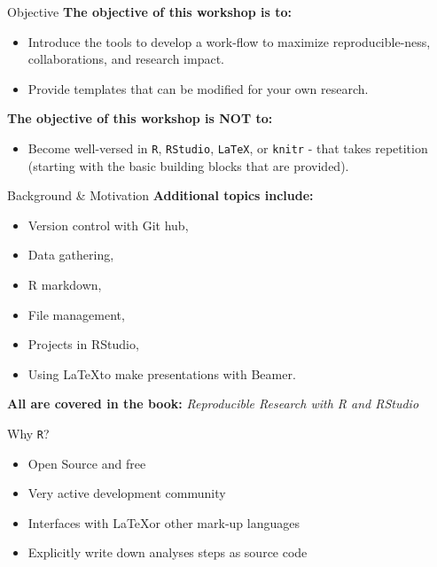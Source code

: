 \documentclass{beamer}\usepackage[]{graphicx}\usepackage[]{color}
\begin{document}
 \begin{frame}[t]{Objective}
   \textbf{The objective of this workshop is to:}
   \begin{itemize}
      \item   Introduce the tools to develop a work-flow to maximize reproducible-ness, collaborations, and research impact.
      \item Provide templates that can be modified for your own research.\vspace{1cm}
   \end{itemize}
   \textbf{The objective of this workshop is NOT to:}
   \begin{itemize}
      \item Become well-versed in \texttt{R}, \texttt{RStudio}, \texttt{\LaTeX}, or \texttt{knitr} - that takes repetition (starting with the basic building blocks that are provided).
   \end{itemize}
\end{frame}
 
\begin{frame}[t]{Background \& Motivation}
   \textbf{Additional topics include:}
   \begin{itemize}
\item  Version control with Git hub,
     \item Data gathering,
     \item R markdown,
     \item File management,
     \item Projects in RStudio,
     \item Using \LaTeX to make presentations with Beamer.\vspace{1cm} 
   \end{itemize}
   \textbf{All are covered in the book:} \emph{Reproducible Research with R and RStudio}
\end{frame}

 \begin{frame}[t]{Why \texttt{R}?}
  \begin{itemize}
    \item Open Source and free
    \item Very active development community
    \item Interfaces with \LaTeX or other mark-up languages
    \item Explicitly write down analyses steps as source code
   \end{itemize}
 \end{frame}
\end{document}
